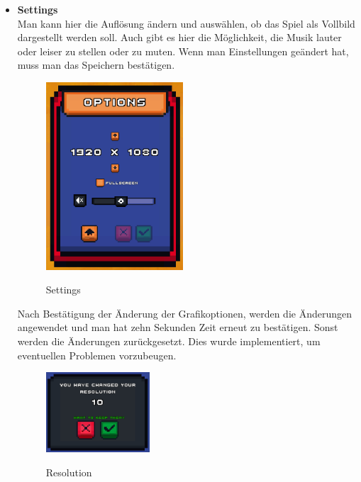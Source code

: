\begin{itemize}
\begin {itemize}
        \item \textbf{Settings}\\
            Man kann hier die Auflösung ändern und auswählen, ob das Spiel als Vollbild dargestellt werden soll. Auch gibt es hier die Möglichkeit, die Musik lauter oder leiser zu stellen
            oder zu muten. Wenn man Einstellungen geändert hat, muss man das Speichern bestätigen. 
            \begin{figure}[H]
                \centering
                \includegraphics[height=7cm]{resources/setting.png}\\
                \caption{Settings}
            \end{figure}
            Nach Bestätigung der Änderung der Grafikoptionen, werden die Änderungen angewendet und man hat zehn Sekunden Zeit erneut zu bestätigen. Sonst werden die Änderungen zurückgesetzt.
            Dies wurde implementiert, um eventuellen Problemen vorzubeugen. 
            \begin{figure}[H]
                \centering
                \includegraphics[height=3cm]{resources/resolution.png}\\
                \caption{Resolution}
            \end{figure}
            

\end{itemize}
\end{itemize}
